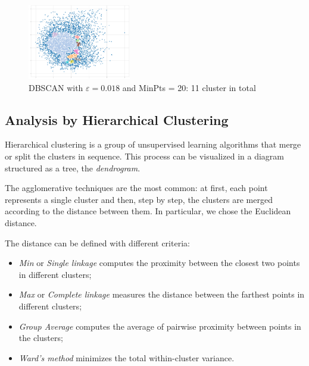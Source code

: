 \documentclass[a4paper,11pt,dvipsnames]{article}
\begin{document}


\begin{figure}[h]
    \centering
    \includegraphics[width=0.4\textwidth]{dbscan.png}
    \caption{DBSCAN with $\varepsilon= 0.018$ and MinPts = 20: 11 cluster in total}
    \label{fig:dbscan}
\end{figure}

\subsection{Analysis by Hierarchical Clustering}
Hierarchical clustering is a group of unsupervised learning algorithms that merge or split the clusters in sequence. This process can be visualized in a diagram structured as a tree, the \textit{dendrogram}. 

The agglomerative techniques are the most common: at first, each point represents a single cluster and then, step by step, the clusters are merged according to the distance between them. In particular, we chose the Euclidean distance. 

The distance can be defined with different criteria: 
\begin{itemize}
    \item \textit{Min} or \textit{Single linkage} computes the proximity between the closest two points in different clusters;
    \item \textit{Max} or \textit{Complete linkage} measures the distance between the farthest points in different clusters;
    \item \textit{Group Average} computes the average of pairwise proximity between points in the clusters;
    \item \textit{Ward's method} minimizes the total within-cluster variance.
\end{itemize}
\end{document}
